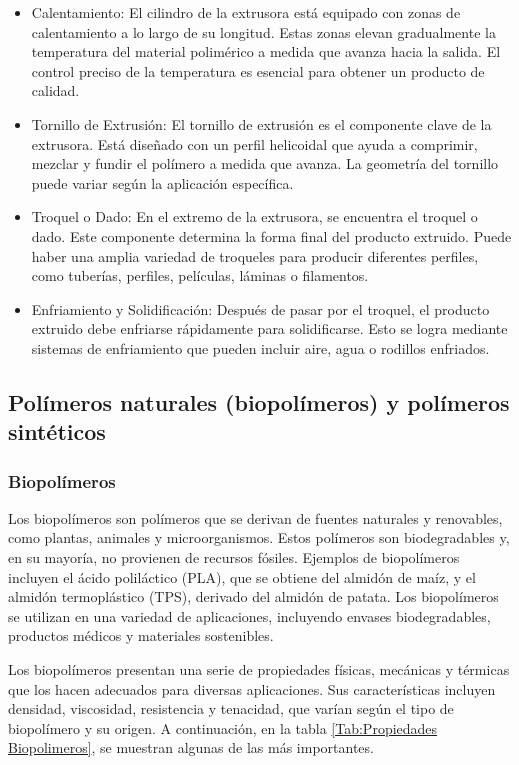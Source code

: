 \documentclass[14pt,oneside]{extarticle} %
\begin{document}
\begin{itemize}
    \item Calentamiento: El cilindro de la extrusora está equipado con zonas de calentamiento a lo largo de su longitud. Estas zonas elevan gradualmente la temperatura del material polimérico a medida que avanza hacia la salida. El control preciso de la temperatura es esencial para obtener un producto de calidad.
    \newpage
    \item Tornillo de Extrusión: El tornillo de extrusión es el componente clave de la extrusora. Está diseñado con un perfil helicoidal que ayuda a comprimir, mezclar y fundir el polímero a medida que avanza. La geometría del tornillo puede variar según la aplicación específica.
    \item Troquel o Dado: En el extremo de la extrusora, se encuentra el troquel o dado. Este componente determina la forma final del producto extruido. Puede haber una amplia variedad de troqueles para producir diferentes perfiles, como tuberías, perfiles, películas, láminas o filamentos.
    \item Enfriamiento y Solidificación: Después de pasar por el troquel, el producto extruido debe enfriarse rápidamente para solidificarse. Esto se logra mediante sistemas de enfriamiento que pueden incluir aire, agua o rodillos enfriados.
\end{itemize}

\subsection{Polímeros naturales (biopolímeros) y polímeros sintéticos}

\subsubsection{Biopolímeros}

Los biopolímeros son polímeros que se derivan de fuentes naturales y renovables, como plantas, animales y microorganismos. Estos polímeros son biodegradables y, en su mayoría, no provienen de recursos fósiles. Ejemplos de biopolímeros incluyen el ácido poliláctico (PLA), que se obtiene del almidón de maíz, y el almidón termoplástico (TPS), derivado del almidón de patata. Los biopolímeros se utilizan en una variedad de aplicaciones, incluyendo envases biodegradables, productos médicos y materiales sostenibles.

Los biopolímeros presentan una serie de propiedades físicas, mecánicas y térmicas que los hacen adecuados para diversas aplicaciones. Sus características incluyen densidad, viscosidad, resistencia y tenacidad, que varían según el tipo de biopolímero y su origen. A continuación, en la tabla \ref{Tab:Propiedades Biopolimeros}, se muestran algunas de las más importantes. 
\end{document}
